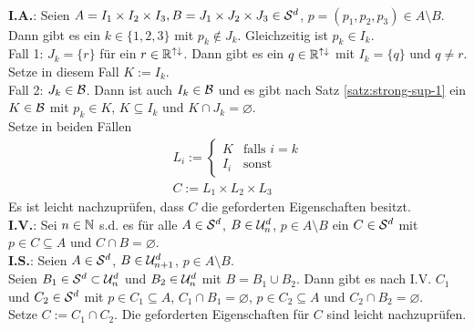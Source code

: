 \begin{bew}\ \\
    \textbf{I.A.}: Seien $A = I_1 \times I_2 \times I_3, B = J_1 \times J_2 \times J_3 \in \mathcal{S}^d$, $p = (p_1,p_2,p_3) \in A \setminus B$.\\
    Dann gibt es ein $k \in \{1,2,3\}$ mit $p_k \notin J_k$. 
    Gleichzeitig ist $p_k \in I_k$.\\
    Fall 1: $J_k = \{r\}$ für ein $r \in \mathbb{R}^{{\uparrow \downarrow}}$. Dann gibt es ein $q \in \mathbb{R}^{{\uparrow \downarrow}}$ mit $I_k = \{q\}$ und $q \neq r$. Setze in diesem Fall $K := I_k$.\\
    Fall 2: $J_k \in \mathcal{B}$. 
    Dann ist auch $I_k \in \mathcal{B}$ und es gibt nach Satz \ref{satz:strong-sup-1} ein $K \in \mathcal{B}$ mit $p_k \in K$, $K \subseteq I_k$ und $K \cap J_k = \varnothing$.\\
    Setze in beiden Fällen
    \begin{align*}
        L_i :=
        \begin{cases}
            K & \text{falls $i=k$}\\
            I_i & \text{sonst}
        \end{cases}\\
        C := L_1 \times L_2 \times L_3
    \end{align*}
    Es ist leicht nachzuprüfen, dass $C$ die geforderten Eigenschaften besitzt.\\
    \textbf{I.V.}: Sei $n \in \mathbb{N}$ s.d. es für alle $A \in \mathcal{S}^d$, $B \in \mathcal{U}_n^d$, $p \in A \setminus B$ ein $C \in \mathcal{S}^d$ mit $p \in C \subseteq A$ und $C \cap B = \varnothing$.\\
    \textbf{I.S.}: Seien $A \in \mathcal{S}^d$, $B \in \mathcal{U}_{n+1}^d$, $p \in A \setminus B$.\\
    Seien $B_1 \in \mathcal{S}^d \subset \mathcal{U}_n^d$ und $B_2 \in \mathcal{U}_n^d$ mit $B = B_1 \cup B_2$.
    Dann gibt es nach I.V. $C_1$ und $C_2 \in \mathcal{S}^d$ mit $p \in C_1 \subseteq A$, $C_1 \cap B_1 = \varnothing$, $p \in C_2 \subseteq A$ und $C_2 \cap B_2 = \varnothing$.\\
    Setze $C := C_1 \cap C_2$. 
    Die geforderten Eigenschaften für $C$ sind leicht nachzuprüfen.
\end{bew}


